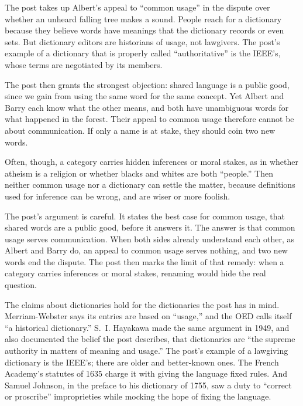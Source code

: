 \begin{afterword}
\summaryhead

The post takes up Albert's appeal to ``common usage'' in the dispute over whether an unheard falling tree makes a sound. People reach for a dictionary because they believe words have meanings that the dictionary records or even sets. But dictionary editors are historians of usage, not lawgivers. The post's example of a dictionary that is properly called ``authoritative'' is the IEEE's, whose terms are negotiated by its members.

The post then grants the strongest objection: shared language is a public good, since we gain from using the same word for the same concept. Yet Albert and Barry each know what the other means, and both have unambiguous words for what happened in the forest. Their appeal to common usage therefore cannot be about communication. If only a name is at stake, they should coin two new words.

Often, though, a category carries hidden inferences or moral stakes, as in whether atheism is a religion or whether blacks and whites are both ``people.'' Then neither common usage nor a dictionary can settle the matter, because definitions used for inference can be wrong, and are wiser or more foolish.

\responsehead

The post's argument is careful. It states the best case for common usage, that shared words are a public good, before it answers it. The answer is that common usage serves communication. When both sides already understand each other, as Albert and Barry do, an appeal to common usage serves nothing, and two new words end the dispute. The post then marks the limit of that remedy: when a category carries inferences or moral stakes, renaming would hide the real question.

The claims about dictionaries hold for the dictionaries the post has in mind. Merriam-Webster says its entries are based on ``usage,'' and the OED calls itself ``a historical dictionary.'' S.~I. Hayakawa made the same argument in 1949, and also documented the belief the post describes, that dictionaries are ``the supreme authority in matters of meaning and usage.'' The post's example of a lawgiving dictionary is the IEEE's; there are older and better-known ones. The French Academy's statutes of 1635 charge it with giving the language fixed rules. And Samuel Johnson, in the preface to his dictionary of 1755, saw a duty to ``correct or proscribe'' improprieties while mocking the hope of fixing the language.


\end{afterword}
